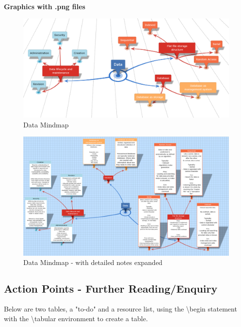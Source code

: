 {{\bfseries{Graphics with .png files}}

\begin{figure}[H]
    \includegraphics[width=\linewidth]{tex/Data_cropped.png}
    \caption{Data Mindmap}
    \label{fig: Data Mindmap}
\end{figure}

\begin{figure}[H]
    \includegraphics[width=\linewidth]{tex/Data_cropped2.png}
    \caption{Data Mindmap - with detailed notes expanded}
    \label{fig:Data Mindmap expanded}
\end{figure}



\subsection{Action Points - Further Reading/Enquiry}

\begin{notes}
    Below are two tables, a "to-do" and a resource list, using the \textbackslash begin statement with the \textbackslash tabular environment to create a table.


\end{notes}}
